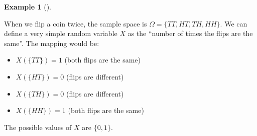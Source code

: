 \documentclass[
  letterpaper,
  DIV=11,
  numbers=noendperiod]{scrreport}
\providecommand{\tightlist}{%
  \setlength{\itemsep}{0pt}\setlength{\parskip}{0pt}}
\theoremstyle{definition}
\newtheorem{example}{Example}[chapter]
\theoremstyle{plain}
\theoremstyle{plain}
\theoremstyle{definition}
\theoremstyle{remark}
\begin{document}
\begin{tcolorbox}[enhanced jigsaw, opacitybacktitle=0.6, bottomtitle=1mm, opacityback=0, toprule=.15mm, colbacktitle=quarto-callout-note-color!10!white, colback=white, left=2mm, title={Random variable: Number of equal coin flips}, breakable, rightrule=.15mm, leftrule=.75mm, titlerule=0mm, colframe=quarto-callout-note-color-frame, arc=.35mm, coltitle=black, toptitle=1mm, bottomrule=.15mm]

\begin{example}[]\protect\hypertarget{exm-random-variable-equals}{}\label{exm-random-variable-equals}

When we flip a coin twice, the sample space is
\(\Omega = \{TT, HT, TH, HH\}\). We can define a very simple random
variable \(X\) as the ``number of times the flips are the same''. The
mapping would be:

\begin{itemize}
\tightlist
\item
  \(X(\{TT\}) = 1\) (both flips are the same)
\item
  \(X(\{HT\}) = 0\) (flips are different)
\item
  \(X(\{TH\}) = 0\) (flips are different)
\item
  \(X(\{HH\}) = 1\) (both flips are the same)
\end{itemize}

The possible values of \(X\) are \(\{0, 1\}\).

\end{example}

\end{tcolorbox}
\end{document}
